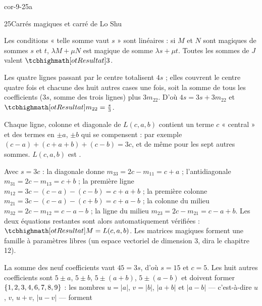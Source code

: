 
\begin{blocLivre}{cor-9-25a}
\begin{corrige}{25}{Carrés magiques et carré de Lo Shu}
\begin{questions}
  \item Les conditions « telle somme vaut $s$ » sont linéaires : si $M$ et
    $N$ sont magiques de sommes $s$ et $t$, $\lambda M+\mu N$ est magique
    de somme $\lambda s+\mu t$. Toutes les sommes de $J$ valent $\res{3}$.
  \item Les quatre lignes passant par le centre totalisent $4s$ ; elles
    couvrent le centre quatre fois et chacune des huit autres cases une
    fois, soit la somme de tous les coefficients ($3s$, somme des trois
    lignes) plus $3m_{22}$. D'où $4s=3s+3m_{22}$ et
    $\res{m_{22}=\tfrac s3}$.
  \item Chaque ligne, colonne et diagonale de $L(c,a,b)$ contient un terme
    $c$ « central » et des termes en $\pm a$, $\pm b$ qui se compensent :
    par exemple $(c-a)+(c+a+b)+(c-b)=3c$, et de même pour les sept autres
    sommes. $L(c,a,b)$ est .
  \item Avec $s=3c$ : la diagonale donne $m_{33}=2c-m_{11}=c+a$ ;
    l'antidiagonale $m_{31}=2c-m_{13}=c+b$ ; la première ligne
    $m_{12}=3c-(c-a)-(c-b)=c+a+b$ ; la première colonne
    $m_{21}=3c-(c-a)-(c+b)=c+a-b$ ; la colonne du milieu
    $m_{32}=2c-m_{12}=c-a-b$ ; la ligne du milieu
    $m_{23}=2c-m_{21}=c-a+b$. Les deux équations restantes sont alors
    automatiquement vérifiées : $\res{M=L(c,a,b)}$. Les matrices magiques
    forment une famille à  paramètres libres (un espace vectoriel
    de dimension $3$, dira le chapitre 12).
\end{questions}
\begin{questions}[resume]
  \item La somme des neuf coefficients vaut $45=3s$, d'où $s=15$ et
    $c=5$. Les huit autres coefficients sont $5\pm a$, $5\pm b$,
    $5\pm(a+b)$, $5\pm(a-b)$ et doivent former
    $\left\{1,2,3,4,6,7,8,9\right\}$ : les nombres $u=|a|$, $v=|b|$,
    $|a+b|$ et $|a-b|$ — c'est-à-dire $u$, $v$, $u+v$, $|u-v|$ — forment

\end{questions}
\end{corrige}
\end{blocLivre}
